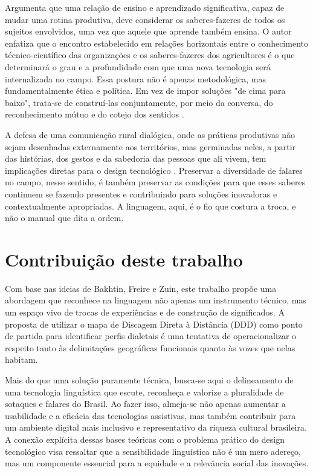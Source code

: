  Argumenta que uma relação de ensino e aprendizado significativa, capaz de mudar uma rotina produtiva, deve considerar os saberes-fazeres de todos os sujeitos envolvidos, uma vez que aquele que aprende também ensina. O autor enfatiza que o encontro estabelecido em relações horizontais entre o conhecimento técnico-científico das organizações e os saberes-fazeres dos agricultores é o que determinará o grau e a profundidade com que uma nova tecnologia será internalizada no campo. Essa postura não é apenas metodológica, mas fundamentalmente ética e política. Em vez de impor soluções "de cima para baixo", trata-se de construí-las conjuntamente, por meio da conversa, do reconhecimento mútuo e do cotejo dos sentidos \cite{zuin2021comunicacao}.

A defesa de uma comunicação rural dialógica, onde as práticas produtivas não sejam desenhadas externamente aos territórios, mas germinadas neles, a partir das histórias, dos gestos e da sabedoria das pessoas que ali vivem, tem implicações diretas para o design tecnológico \cite{zuin2021comunicacao}. Preservar a diversidade de falares no campo, nesse sentido, é também preservar as condições para que esses saberes continuem se fazendo presentes e contribuindo para soluções inovadoras e contextualmente apropriadas. A linguagem, aqui, é o fio que costura a troca, e não o manual que dita a ordem.



\section{Contribuição deste trabalho}

Com base nas ideias de Bakhtin, Freire e Zuin, este trabalho propõe uma abordagem que reconhece na linguagem não apenas um instrumento técnico, mas um espaço vivo de trocas de experiências e de construção de significados. A proposta de utilizar o mapa de Discagem Direta à Distância (DDD) como ponto de partida para identificar perfis dialetais é uma tentativa de operacionalizar o respeito tanto às delimitações geográficas funcionais quanto às vozes que nelas habitam.

Mais do que uma solução puramente técnica, busca-se aqui o delineamento de uma tecnologia linguística que escute, reconheça e valorize a pluralidade de sotaques e falares do Brasil. Ao fazer isso, almeja-se não apenas aumentar a usabilidade e a eficácia das tecnologias assistivas, mas também contribuir para um ambiente digital mais inclusivo e representativo da riqueza cultural brasileira. A conexão explícita dessas bases teóricas com o problema prático do design tecnológico visa ressaltar que a sensibilidade linguística não é um mero adereço, mas um componente essencial para a equidade e a relevância social das inovações.











